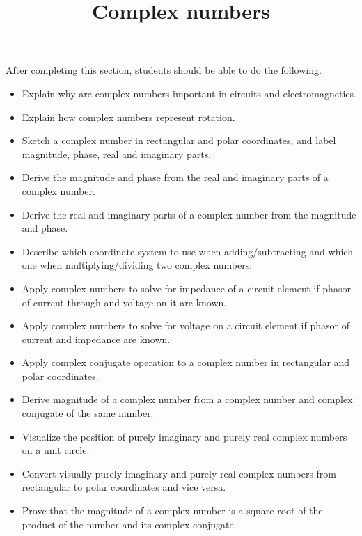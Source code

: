 \documentclass{ximera}
\title{Complex numbers}
\begin{document}
\begin{abstract}
\end{abstract}

\maketitle

\begin{sectionOutcomes}

After completing this section, students should be able to do the following.

\begin{itemize}
\item Explain why are complex numbers important in circuits and electromagnetics.
\item Explain how complex numbers represent rotation.
\item Sketch a complex number in rectangular and polar coordinates, and label magnitude, phase, real and imaginary parts.
\item Derive the magnitude and phase from the real and imaginary parts of a complex number.
\item Derive the real and imaginary parts of a complex number from the magnitude and phase.
\item Describe which coordinate system to use when adding/subtracting and which one when multiplying/dividing two complex numbers.
\item Apply complex numbers to solve for impedance of a circuit element if phasor of current through and voltage on it are known.
\item Apply complex numbers to solve for voltage on a circuit element if phasor of current and impedance are known.
\item Apply complex conjugate operation to a complex number in rectangular and polar coordinates.
\item Derive magnitude of a complex number from a complex number and complex conjugate of the same number.
\item Visualize the position of  purely imaginary and purely real complex numbers on a unit circle.
\item Convert visually purely imaginary and purely real complex numbers from rectangular to polar coordinates and vice versa.
\item Prove that the magnitude of a complex number is a square root of the product of the number and its complex conjugate.
\end{itemize}

\end{sectionOutcomes}
\end{document}
